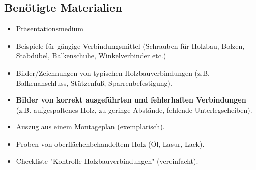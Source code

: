 \documentclass[12pt, a4paper]{article}
\begin{document}
\subsection{Benötigte Materialien}
\begin{itemize}
    \item Präsentationsmedium
    \item Beispiele für gängige Verbindungsmittel (Schrauben für Holzbau, Bolzen, Stabdübel, Balkenschuhe, Winkelverbinder etc.)
    \item Bilder/Zeichnungen von typischen Holzbauverbindungen (z.B. Balkenanschluss, Stützenfuß, Sparrenbefestigung).
    \item \textbf{Bilder von korrekt ausgeführten und fehlerhaften Verbindungen} (z.B. aufgespaltenes Holz, zu geringe Abstände, fehlende Unterlegscheiben).
    \item Auszug aus einem Montageplan (exemplarisch).
    \item Proben von oberflächenbehandeltem Holz (Öl, Lasur, Lack).
    \item Checkliste "Kontrolle Holzbauverbindungen" (vereinfacht).
\end{itemize}
\end{document}
